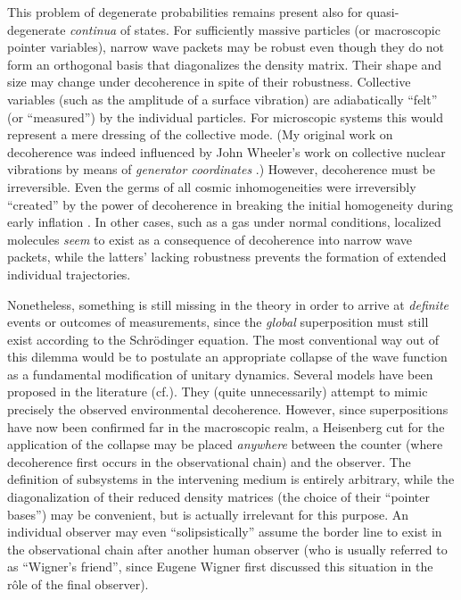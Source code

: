 \documentclass[12pt]{article}
\newcommand{\ts}{\hspace{3pt}}
\begin{document}
This problem of degenerate probabilities remains present also for
quasi-degenerate {\it continua} of states. For sufficiently massive
particles (or macroscopic pointer variables), narrow wave packets may
be robust even though they do not form an orthogonal basis that
diagonalizes the density matrix. Their shape and size may change under
decoherence in spite of their robustness. Collective
variables (such as the amplitude of a surface vibration) are
adiabatically ``felt'' (or ``measured'') by the individual particles.
For microscopic systems this would represent a mere dressing of the
collective mode. (My original work on decoherence was indeed
influenced by John Wheeler's work on collective nuclear vibrations by
means of {\it generator coordinates}
\cite{GW}.) However, decoherence must be irreversible. Even
the germs of all cosmic inhomogeneities were irreversibly ``created''
by the power of decoherence in breaking the initial
homogeneity during early inflation
\cite{K+Polarski}. In other cases, such as a gas under normal
conditions, localized molecules {\it seem} to exist as a consequence
of decoherence into narrow wave packets, while the latters' lacking
robustness prevents the formation of extended individual trajectories.

Nonetheless, something is still missing in the theory in order to
arrive at {\it definite} events or outcomes of measurements, since the
{\it global} superposition must still exist according to the
Schr\"odinger equation. The most conventional way out of this dilemma
would be to postulate an appropriate collapse of the wave function as
a fundamental modification of unitary dynamics. Several models have
been proposed in the literature
(cf.\ts \cite{GRW}). They (quite unnecessarily) attempt to mimic
precisely the observed environmental decoherence. However, since
superpositions have now been confirmed far in the macroscopic realm, a
Heisenberg cut for the application of the collapse may be placed {\it
anywhere} between the counter (where decoherence first occurs in the
observational chain) and the observer. The definition of subsystems in
the intervening medium is entirely arbitrary, while the
diagonalization of their reduced density matrices (the choice of their
``pointer bases'') may be convenient, but is actually irrelevant for
this purpose. An individual observer may even ``solipsistically''
assume the border line to exist in the observational chain after
another human observer (who is usually referred to as ``Wigner's
friend'', since Eugene Wigner first discussed this situation in the
r\^ole of the final observer).
\end{document}
